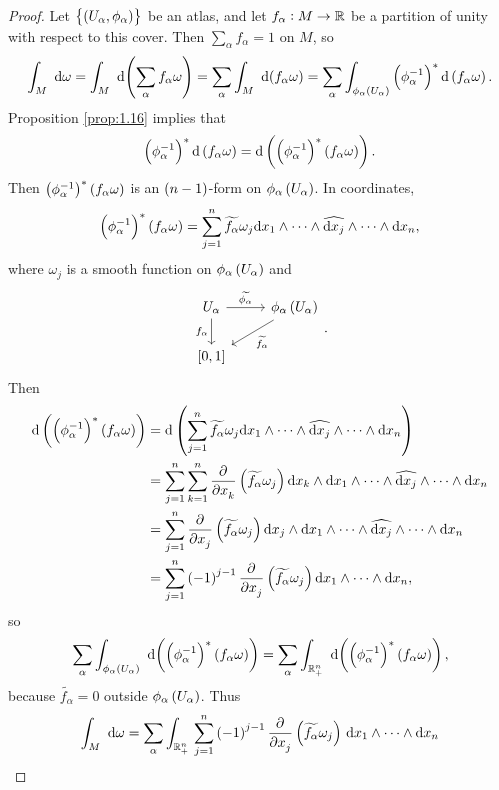 \begin{proof}
Let $ \cbr{\br{U_\alpha, \phi_\alpha}} $ be an atlas, and let $ f_\alpha : M \to \mathbb{R} $ be a partition of unity with respect to this cover. Then $ \sum_\alpha f_\alpha = 1 $ on $ M $, so
$$ \intd{M}{}{}{\omega} = \intd{M}{}{}{\br{\sum_\alpha f_\alpha\omega}} = \sum_\alpha \intd{M}{}{}{\br{f_\alpha\omega}} = \sum_\alpha \int_{\phi_\alpha\br{U_\alpha}} \br{\phi_\alpha^{-1}}^*\d\br{f_\alpha\omega}. $$
Proposition \ref{prop:1.16} implies that
$$ \br{\phi_\alpha^{-1}}^*\d\br{f_\alpha\omega} = \d\br{\br{\phi_\alpha^{-1}}^*\br{f_\alpha\omega}}. $$
Then $ \br{\phi_\alpha^{-1}}^*\br{f_\alpha\omega} $ is an $ \br{n - 1} $-form on $ \phi_\alpha\br{U_\alpha} $. In coordinates,
$$ \br{\phi_\alpha^{-1}}^*\br{f_\alpha\omega} = \sum_{j = 1}^n \widetilde{f_\alpha}\omega_j \d x_1 \wedge \dots \wedge \widehat{\d x_j} \wedge \dots \wedge \d x_n, $$
where $ \omega_j $ is a smooth function on $ \phi_\alpha\br{U_\alpha} $ and
$$
\begin{tikzcd}
U_\alpha \arrow{r}{\widetilde{\phi_\alpha}} \arrow[swap]{d}{f_\alpha} & \phi_\alpha\br{U_\alpha} \arrow{dl}{\widetilde{f_\alpha}} \\
\sbr{0, 1} &
\end{tikzcd}.
$$
Then
\begin{align*}
\d\br{\br{\phi_\alpha^{-1}}^*\br{f_\alpha\omega}}
& = \d\br{\sum_{j = 1}^n \widetilde{f_\alpha}\omega_j \d x_1 \wedge \dots \wedge \widehat{\d x_j} \wedge \dots \wedge \d x_n} \\
& = \sum_{j = 1}^n \sum_{k = 1}^n \dpd{}{x_k}\br{\widetilde{f_\alpha}\omega_j} \d x_k \wedge \d x_1 \wedge \dots \wedge \widehat{\d x_j} \wedge \dots \wedge \d x_n \\
& = \sum_{j = 1}^n \dpd{}{x_j}\br{\widetilde{f_\alpha}\omega_j} \d x_j \wedge \d x_1 \wedge \dots \wedge \widehat{\d x_j} \wedge \dots \wedge \d x_n \\
& = \sum_{j = 1}^n \br{-1}^{j - 1}\dpd{}{x_j}\br{\widetilde{f_\alpha}\omega_j} \d x_1 \wedge \dots \wedge \d x_n,
\end{align*}
so
$$ \sum_\alpha \intd{\phi_\alpha\br{U_\alpha}}{}{}{\br{\br{\phi_\alpha^{-1}}^*\br{f_\alpha\omega}}} = \sum_\alpha \intd{\RR_+^n}{}{}{\br{\br{\phi_\alpha^{-1}}^*\br{f_\alpha\omega}}}, $$
because $ \widetilde{f_\alpha} = 0 $ outside $ \phi_\alpha\br{U_\alpha} $. Thus
\begin{align*}
\intd{M}{}{}{\omega}
& = \sum_\alpha \intd{\RR_+^n}{}{\sum_{j = 1}^n \br{-1}^{j - 1}\dpd{}{x_j}\br{\widetilde{f_\alpha}\omega_j}}{x_1 \wedge \dots \wedge \d x_n} \\

\end{align*}
\end{proof}
